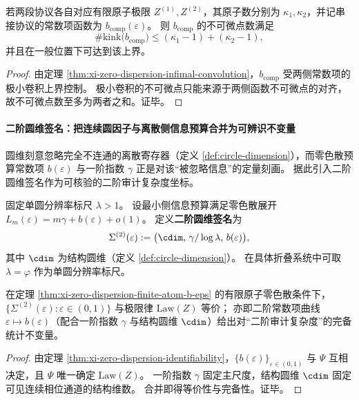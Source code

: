 \begin{corollary}[有限原子零色散在串接下的折点数上界]\label{cor:xi-zero-dispersion-kink-count-under-composition}
若两段协议各自对应有限原子极限 \(Z^{(1)},Z^{(2)}\)，其原子数分别为 \(\kappa_1,\kappa_2\)，并记串接协议的常数项函数为 \(b_{\mathrm{comp}}(\varepsilon)\)。
则 \(b_{\mathrm{comp}}\) 的不可微点数满足
\[
\#\mathrm{kink}\bigl(b_{\mathrm{comp}}\bigr)\le (\kappa_1-1)+(\kappa_2-1),
\]
并且在一般位置下可达到该上界。
\end{corollary}
\begin{proof}
由定理 \ref{thm:xi-zero-dispersion-infimal-convolution}，\(b_{\mathrm{comp}}\) 受两侧常数项的极小卷积上界控制。
极小卷积的不可微点只能来源于两侧函数不可微点的对齐，故不可微点数至多为两者之和。证毕。
\end{proof}

\paragraph{二阶圆维签名：把连续圆因子与离散侧信息预算合并为可辨识不变量}
圆维刻意忽略完全不连通的离散寄存器（定义 \ref{def:circle-dimension}），而零色散预算常数项 \(b(\varepsilon)\) 与一阶指数 \(\gamma\) 正是对该“被忽略信息”的定量刻画。
据此引入二阶圆维签名作为可核验的二阶审计复杂度坐标。

\begin{definition}[二阶圆维签名作为侧信息复杂度坐标]\label{def:xi-second-order-circle-dimension-signature}
固定单圆分辨率标尺 \(\lambda>1\)。
设最小侧信息预算满足零色散展开 \(L_m(\varepsilon)=m\gamma+b(\varepsilon)+o(1)\)。
定义\textbf{二阶圆维签名}为
\[
\Sigma^{(2)}(\varepsilon):=\bigl(\cdim,\,\gamma/\log\lambda,\,b(\varepsilon)\bigr),
\]
其中 \(\cdim\) 为结构圆维（定义 \ref{def:circle-dimension}）。
在具体折叠系统中可取 \(\lambda=\varphi\) 作为单圆分辨率标尺。
\end{definition}

\begin{proposition}\label{prop:xi-second-order-circle-dimension-signature-completeness}
在定理 \ref{thm:xi-zero-dispersion-finite-atom-b-eps} 的有限原子零色散条件下，
\(\{\Sigma^{(2)}(\varepsilon):\varepsilon\in(0,1)\}\) 与极限律 \(\mathrm{Law}(Z)\) 等价；
亦即二阶常数项曲线 \(\varepsilon\mapsto b(\varepsilon)\)（配合一阶指数 \(\gamma\) 与结构圆维 \(\cdim\)）给出对“二阶审计复杂度”的完备统计不变量。
\end{proposition}
\begin{proof}
由定理 \ref{thm:xi-zero-dispersion-identifiability}，\(\{b(\varepsilon)\}_{\varepsilon\in(0,1)}\) 与 \(\Psi\) 互相决定，且 \(\Psi\) 唯一确定 \(\mathrm{Law}(Z)\)。
一阶指数 \(\gamma\) 固定主尺度，结构圆维 \(\cdim\) 固定可见连续相位通道的结构维数。
合并即得等价性与完备性。证毕。
\end{proof}

